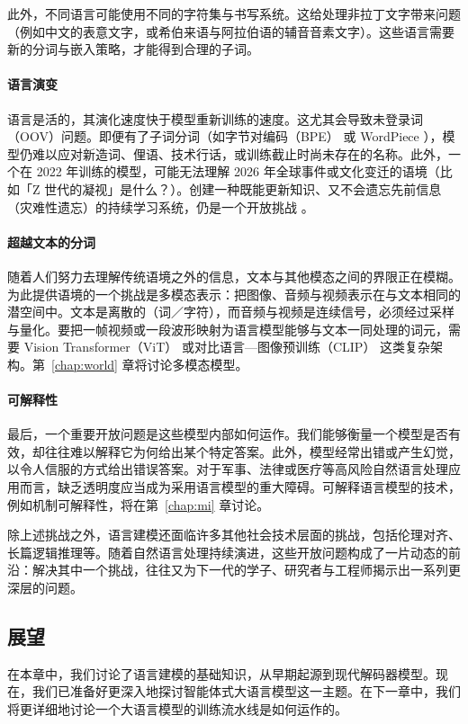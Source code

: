 此外，不同语言可能使用不同的字符集与书写系统。这给处理非拉丁文字带来问题（例如中文的表意文字，或希伯来语与阿拉伯语的辅音音素文字）。这些语言需要新的分词与嵌入策略，才能得到合理的子词。

\paragraph{语言演变}
语言是活的，其演化速度快于模型重新训练的速度。这尤其会导致未登录词（OOV）问题。即便有了子词分词（如字节对编码（BPE）\citep{gage1994new} 或 WordPiece \citep{song2021fast}），模型仍难以应对新造词、俚语、技术行话，或训练截止时尚未存在的名称。此外，一个在 2022 年训练的模型，可能无法理解 2026 年全球事件或文化变迁的语境（比如「Z 世代的凝视」是什么？）。创建一种既能更新知识、又不会遗忘先前信息（灾难性遗忘）的持续学习系统，仍是一个开放挑战 \citep{wu2024continual}。

\paragraph{超越文本的分词}
随着人们努力去理解传统语境之外的信息，文本与其他模态之间的界限正在模糊。为此提供语境的一个挑战是多模态表示：把图像、音频与视频表示在与文本相同的潜空间中。文本是离散的（词／字符），而音频与视频是连续信号，必须经过采样与量化。要把一帧视频或一段波形映射为语言模型能够与文本一同处理的词元，需要 Vision Transformer（ViT）\citep{han2022survey} 或对比语言—图像预训练（CLIP）\citep{radford2021learning} 这类复杂架构。第~\ref{chap:world} 章将讨论多模态模型。

\paragraph{可解释性}
最后，一个重要开放问题是这些模型内部如何运作。我们能够衡量一个模型是否有效，却往往难以解释它为何给出某个特定答案。此外，模型经常出错或产生幻觉，以令人信服的方式给出错误答案。对于军事、法律或医疗等高风险自然语言处理应用而言，缺乏透明度应当成为采用语言模型的重大障碍。可解释语言模型的技术，例如机制可解释性，将在第~\ref{chap:mi} 章讨论。

除上述挑战之外，语言建模还面临许多其他社会技术层面的挑战，包括伦理对齐、长篇逻辑推理等。随着自然语言处理持续演进，这些开放问题构成了一片动态的前沿：解决其中一个挑战，往往又为下一代的学子、研究者与工程师揭示出一系列更深层的问题。

\subsection{展望}
在本章中，我们讨论了语言建模的基础知识，从早期起源到现代解码器模型。现在，我们已准备好更深入地探讨智能体式大语言模型这一主题。在下一章中，我们将更详细地讨论一个大语言模型的训练流水线是如何运作的。

